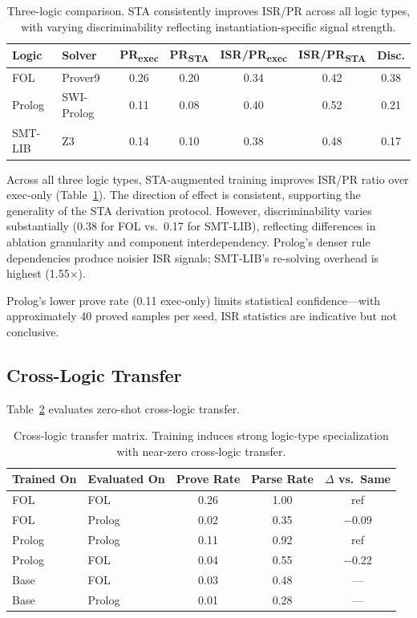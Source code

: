\documentclass[11pt,a4paper]{article}
\begin{document}
\begin{table}[t]
\centering
\small
\caption{Three-logic comparison. STA consistently improves ISR/PR across all logic types, with varying discriminability reflecting instantiation-specific signal strength.}
\label{tab:three_logic}
\begin{tabular}{llccccc}
\toprule
Logic & Solver & PR\textsubscript{exec} & PR\textsubscript{STA} & ISR/PR\textsubscript{exec} & ISR/PR\textsubscript{STA} & Disc. \\
\midrule
FOL     & Prover9    & 0.26 & 0.20 & 0.34 & 0.42 & 0.38 \\
Prolog  & SWI-Prolog & 0.11 & 0.08 & 0.40 & 0.52 & 0.21 \\
SMT-LIB & Z3         & 0.14 & 0.10 & 0.38 & 0.48 & 0.17 \\
\bottomrule
\end{tabular}
\end{table}

Across all three logic types, STA-augmented training improves ISR/PR ratio over exec-only (Table~\ref{tab:three_logic}).
The direction of effect is consistent, supporting the generality of the STA derivation protocol.
However, discriminability varies substantially (0.38 for FOL vs.\ 0.17 for SMT-LIB), reflecting differences in ablation granularity and component interdependency.
Prolog's denser rule dependencies produce noisier ISR signals; SMT-LIB's re-solving overhead is highest (1.55$\times$).

Prolog's lower prove rate (0.11 exec-only) limits statistical confidence---with approximately 40 proved samples per seed, ISR statistics are indicative but not conclusive.

\subsection{Cross-Logic Transfer}

Table~\ref{tab:transfer} evaluates zero-shot cross-logic transfer.

\begin{table}[t]
\centering
\small
\caption{Cross-logic transfer matrix. Training induces strong logic-type specialization with near-zero cross-logic transfer.}
\label{tab:transfer}
\begin{tabular}{llccc}
\toprule
Trained On & Evaluated On & Prove Rate & Parse Rate & $\Delta$ vs.\ Same \\
\midrule
FOL    & FOL    & 0.26 & 1.00 & ref \\
FOL    & Prolog & 0.02 & 0.35 & $-$0.09 \\
Prolog & Prolog & 0.11 & 0.92 & ref \\
Prolog & FOL    & 0.04 & 0.55 & $-$0.22 \\
Base   & FOL    & 0.03 & 0.48 & --- \\
Base   & Prolog & 0.01 & 0.28 & --- \\
\bottomrule
\end{tabular}
\end{table}
\end{document}

